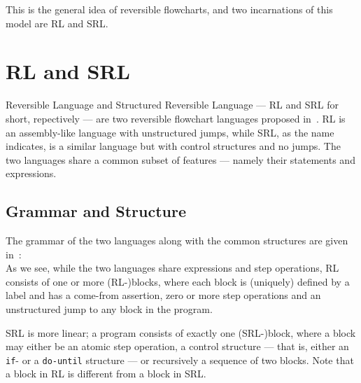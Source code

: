
\noindent This is the general idea of reversible flowcharts, and two incarnations of this model are RL and SRL.\



\section*{RL and SRL}
\noindent Reversible Language and Structured Reversible Language --- RL and SRL for short, repectively --- are two reversible flowchart languages proposed in~\cite{REV}. RL is an assembly-like language with unstructured jumps, while SRL, as the name indicates, is a similar language but with control structures and no jumps. The two languages share a common subset of features --- namely their statements and expressions.

\subsection*{Grammar and Structure}

The grammar of the two languages along with the common structures are given in~\cite{REV}:\\


\noindent As we see, while the two languages share expressions and step operations, RL consists of one or more (RL-)blocks, where each block is (uniquely) defined by a label and has a come-from assertion, zero or more step operations and an unstructured jump to any block in the program.

SRL is more linear; a program consists of exactly one (SRL-)block, where a block may either be an atomic step operation, a control structure --- that is, either an \texttt{if}- or a \texttt{do-until} structure --- or recursively a sequence of two blocks. Note that a block in RL is different from a block in SRL.\

